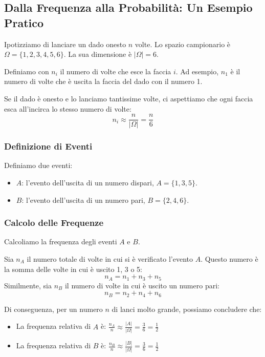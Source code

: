 
\subsection{Dalla Frequenza alla Probabilità: Un Esempio Pratico}

Ipotizziamo di lanciare un dado onesto $n$ volte. Lo spazio campionario è $\Omega = \{1, 2, 3, 4, 5, 6\}$. La sua dimensione è $|\Omega| = 6$.

Definiamo con $n_i$ il numero di volte che esce la faccia $i$. Ad esempio, $n_1$ è il numero di volte che è uscita la faccia del dado con il numero 1.

Se il dado è onesto e lo lanciamo tantissime volte, ci aspettiamo che ogni faccia esca all'incirca lo stesso numero di volte:
\[ n_i \approx \frac{n}{|\Omega|} = \frac{n}{6} \]

\subsubsection{Definizione di Eventi}
Definiamo due eventi:
\begin{itemize}
    \item $A$: l'evento dell'uscita di un numero dispari, $A = \{1, 3, 5\}$.
    \item $B$: l'evento dell'uscita di un numero pari, $B = \{2, 4, 6\}$.
\end{itemize}

\subsubsection{Calcolo delle Frequenze}
Calcoliamo la frequenza degli eventi $A$ e $B$.

Sia $n_A$ il numero totale di volte in cui si è verificato l'evento $A$. Questo numero è la somma delle volte in cui è uscito 1, 3 o 5:
\[ n_A = n_1 + n_3 + n_5 \]
Similmente, sia $n_B$ il numero di volte in cui è uscito un numero pari:
\[ n_B = n_2 + n_4 + n_6 \]

Di conseguenza, per un numero $n$ di lanci molto grande, possiamo concludere che:
\begin{itemize}
    \item La frequenza relativa di $A$ è: $\frac{n_A}{n} \approx \frac{|A|}{|\Omega|} = \frac{3}{6} = \frac{1}{2}$
    \item La frequenza relativa di $B$ è: $\frac{n_B}{n} \approx \frac{|B|}{|\Omega|} = \frac{3}{6} = \frac{1}{2}$
\end{itemize}

